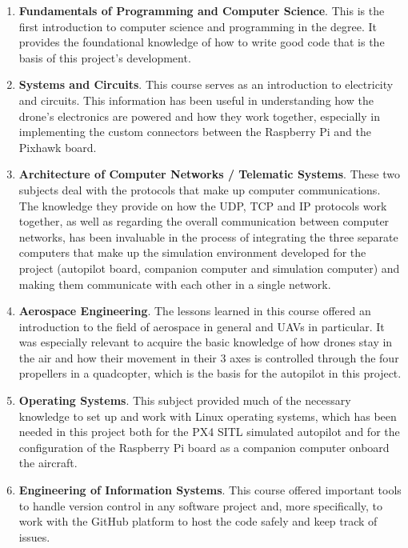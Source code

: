 \begin{enumerate}
    \item \textbf{Fundamentals of Programming and Computer Science}. This is the first introduction to computer science and programming in the degree. It provides the foundational knowledge of how to write good code that is the basis of this project's development.
    
    \item \textbf{Systems and Circuits}. This course serves as an introduction to electricity and circuits. This information has been useful in understanding how the drone's electronics are powered and how they work together, especially in implementing the custom connectors between the Raspberry Pi and the Pixhawk board.
    
    \item \textbf{Architecture of Computer Networks / Telematic Systems}. These two subjects deal with the protocols that make up computer communications. The knowledge they provide on how the UDP, TCP and IP protocols work together, as well as regarding the overall communication between computer networks, has been invaluable in the process of integrating the three separate computers that make up the simulation environment developed for the project (autopilot board, companion computer and simulation computer) and making them communicate with each other in a single network.
    
    \item \textbf{Aerospace Engineering}. The lessons learned in this course offered an introduction to the field of aerospace in general and UAVs in particular. It was especially relevant to acquire the basic knowledge of how drones stay in the air and how their movement in their 3 axes is controlled through the four propellers in a quadcopter, which is the basis for the autopilot in this project.
    
    \item \textbf{Operating Systems}. This subject provided much of the necessary knowledge to set up and work with Linux operating systems, which has been needed in this project both for the PX4 SITL simulated autopilot and for the configuration of the Raspberry Pi board as a companion computer onboard the aircraft.
    
    \item \textbf{Engineering of Information Systems}. This course offered important tools to handle version control in any software project and, more specifically, to work with the GitHub platform to host the code safely and keep track of issues.
    

\end{enumerate}
